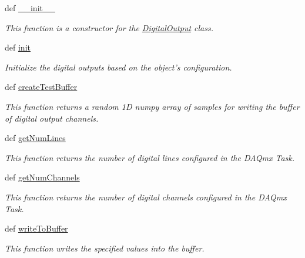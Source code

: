 \begin{DoxyCompactItemize}
def \hyperlink{class_chassis_8git_1_1_digital_output_1_1_digital_output_a7ab9a21c470d9a453d090770fd1d958c}{\-\_\-\-\_\-init\-\_\-\-\_\-}
\begin{DoxyCompactList}\small\item\em This function is a constructor for the \hyperlink{class_chassis_8git_1_1_digital_output_1_1_digital_output}{Digital\-Output} class. \end{DoxyCompactList}\item 
def \hyperlink{class_chassis_8git_1_1_digital_output_1_1_digital_output_adf35fabba6014d608be1250b5046f6a2}{init}
\begin{DoxyCompactList}\small\item\em Initialize the digital outputs based on the object's configuration. \end{DoxyCompactList}\item 
def \hyperlink{class_chassis_8git_1_1_digital_output_1_1_digital_output_a5291fe57ed3662505956d9d5ff53cbfd}{create\-Test\-Buffer}
\begin{DoxyCompactList}\small\item\em This function returns a random 1\-D numpy array of samples for writing the buffer of digital output channels. \end{DoxyCompactList}\item 
def \hyperlink{class_chassis_8git_1_1_digital_output_1_1_digital_output_a6a3f42eeb7ee5c640992a7e82230f149}{get\-Num\-Lines}
\begin{DoxyCompactList}\small\item\em This function returns the number of digital lines configured in the D\-A\-Qmx Task. \end{DoxyCompactList}\item 
def \hyperlink{class_chassis_8git_1_1_digital_output_1_1_digital_output_a296b6f4d60dd9bd7a39a4dcfc5923784}{get\-Num\-Channels}
\begin{DoxyCompactList}\small\item\em This function returns the number of digital channels configured in the D\-A\-Qmx Task. \end{DoxyCompactList}\item 
def \hyperlink{class_chassis_8git_1_1_digital_output_1_1_digital_output_a336402c8845e8439060103d36549d223}{write\-To\-Buffer}
\begin{DoxyCompactList}\small\item\em This function writes the specified values into the buffer. \end{DoxyCompactList}\item 

\end{DoxyCompactItemize}
